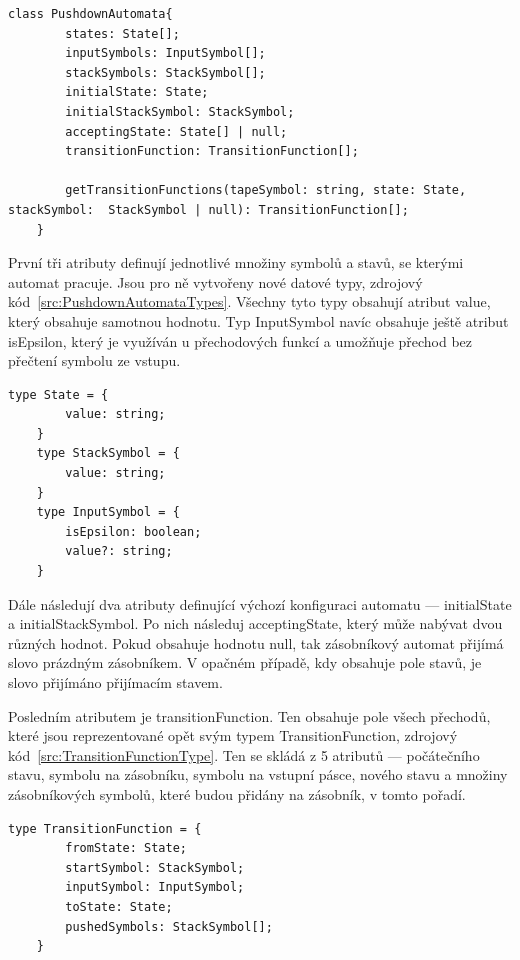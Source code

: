 \begin{lstlisting}[label=src:PushdownAutomataDefinition, caption={Deklarce třídy PushdownAutomata}]
    class PushdownAutomata{
        states: State[];
        inputSymbols: InputSymbol[];
        stackSymbols: StackSymbol[];
        initialState: State;
        initialStackSymbol: StackSymbol;
        acceptingState: State[] | null;
        transitionFunction: TransitionFunction[];

        getTransitionFunctions(tapeSymbol: string, state: State, stackSymbol:  StackSymbol | null): TransitionFunction[];
    }
\end{lstlisting}

První tři atributy definují jednotlivé množiny symbolů a stavů, se kterými automat pracuje. Jsou pro ně vytvořeny nové datové typy, zdrojový kód~\ref{src:PushdownAutomataTypes}. Všechny tyto typy obsahují atribut value, který obsahuje samotnou hodnotu. Typ InputSymbol navíc obsahuje ještě atribut isEpsilon, který je využíván u přechodových funkcí a umožňuje přechod bez přečtení symbolu ze vstupu.

\begin{lstlisting}[label=src:PushdownAutomataTypes, caption={Datové typ State, StackSymbol, InputSymbol}]
    type State = {
        value: string;
    }
    type StackSymbol = {
        value: string;
    }
    type InputSymbol = {
        isEpsilon: boolean;
        value?: string;
    }
\end{lstlisting}

Dále následují dva atributy definující výchozí konfiguraci automatu --- initialState a initialStackSymbol. Po nich následuj acceptingState, který může nabývat dvou různých hodnot. Pokud obsahuje hodnotu null, tak zásobníkový automat přijímá slovo prázdným zásobníkem. V opačném případě, kdy obsahuje pole stavů, je slovo přijímáno přijímacím stavem.

Posledním atributem je transitionFunction. Ten obsahuje pole všech přechodů, které jsou reprezentované opět svým typem TransitionFunction, zdrojový kód~\ref{src:TransitionFunctionType}. Ten se skládá z 5 atributů --- počátečního stavu, symbolu na zásobníku, symbolu na vstupní pásce, nového stavu a množiny zásobníkových symbolů, které budou přidány na zásobník, v tomto pořadí.

\begin{lstlisting}[label=src:TransitionFunctionType, caption={Datové typ TransitionFunction}]
    type TransitionFunction = {
        fromState: State;
        startSymbol: StackSymbol;
        inputSymbol: InputSymbol;
        toState: State;
        pushedSymbols: StackSymbol[];
    }
\end{lstlisting}

